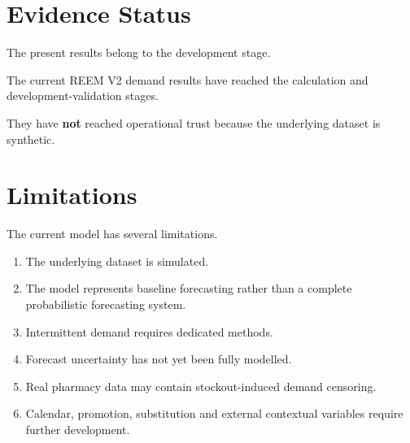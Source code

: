 \documentclass[11pt,a4paper]{article}
\begin{document}
\section{Evidence Status}

The present results belong to the development stage.

\begin{center}
\end{center}

The current REEM V2 demand results have reached the calculation and
development-validation stages.

They have \textbf{not} reached operational trust because the underlying
dataset is synthetic.

\section{Limitations}

The current model has several limitations.

\begin{enumerate}[leftmargin=1.5cm]
\item The underlying dataset is simulated.
\item The model represents baseline forecasting rather than a complete
probabilistic forecasting system.
\item Intermittent demand requires dedicated methods.
\item Forecast uncertainty has not yet been fully modelled.
\item Real pharmacy data may contain stockout-induced demand censoring.
\item Calendar, promotion, substitution and external contextual variables
require further development.
\end{enumerate}
\end{document}
